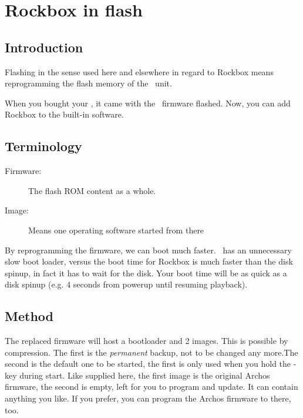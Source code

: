 \section{\label{ref:Rockboxinflash}Rockbox in flash}

\subsection{Introduction}
Flashing in the sense used here and elsewhere in regard to Rockbox means 
reprogramming the flash memory of the \playerman\ unit.

When you bought your \playerman, it came with the \playerman\ firmware flashed.
Now, you can add Rockbox to the built-in software.

\subsection{Terminology}
\begin{description}
\item[Firmware: ] The flash ROM content as a whole.
\item[Image: ] Means one operating software started from there
\end{description}

By reprogramming the firmware, we can boot much faster. \playerman\ has an 
unnecessary slow boot loader, versus the boot time for Rockbox is much faster 
than the disk spinup, in fact it has to wait for the disk. Your boot time will 
be as quick as a disk spinup (e.g. 4 seconds from powerup until resuming 
playback).

\subsection{Method}

The replaced firmware will host a bootloader and 2 images. This is possible by 
compression. The first is the \emph{permanent} backup, not to be changed any 
more.The second is the default one to be started, the first is only used when 
you hold the  -key during start. Like supplied here, the first image 
is the original Archos firmware, the second is empty, left for you to program 
and update. It can contain anything you like. If you prefer, you can program 
the Archos firmware to there, too.

